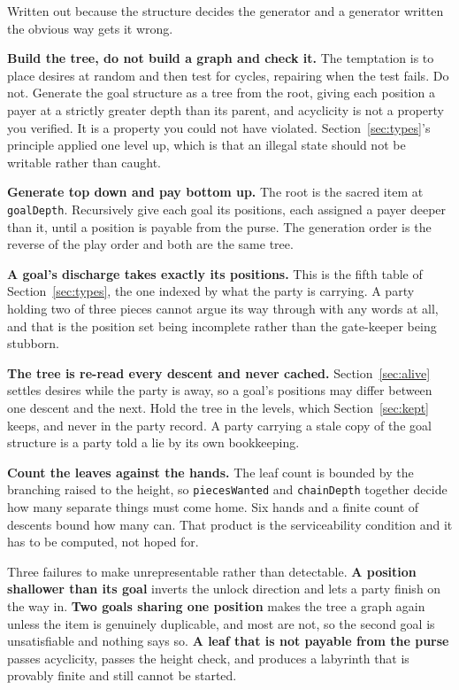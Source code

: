 \documentclass[11pt,a4paper]{article}
\begin{document}
Written out because the structure decides the generator and a generator written the obvious way
gets it wrong.

\textbf{Build the tree, do not build a graph and check it.} The temptation is to place desires at
random and then test for cycles, repairing when the test fails. Do not. Generate the goal structure
as a tree from the root, giving each position a payer at a strictly greater depth than its parent,
and acyclicity is not a property you verified. It is a property you could not have violated.
Section~\ref{sec:types}'s principle applied one level up, which is that an illegal state should not
be writable rather than caught.

\textbf{Generate top down and pay bottom up.} The root is the sacred item at \texttt{goalDepth}.
Recursively give each goal its positions, each assigned a payer deeper than it, until a position is
payable from the purse. The generation order is the reverse of the play order and both are the
same tree.

\textbf{A goal's discharge takes exactly its positions.} This is the fifth table of
Section~\ref{sec:types}, the one indexed by what the party is carrying. A party holding two of
three pieces cannot argue its way through with any words at all, and that is the position set being
incomplete rather than the gate-keeper being stubborn.

\textbf{The tree is re-read every descent and never cached.} Section~\ref{sec:alive} settles
desires while the party is away, so a goal's positions may differ between one descent and the next.
Hold the tree in the levels, which Section~\ref{sec:kept} keeps, and never in the party record.
A party carrying a stale copy of the goal structure is a party told a lie by its own bookkeeping.

\textbf{Count the leaves against the hands.} The leaf count is bounded by the branching raised to
the height, so \texttt{piecesWanted} and \texttt{chainDepth} together decide how many separate
things must come home. Six hands and a finite count of descents bound how many can. That product is
the serviceability condition and it has to be computed, not hoped for.

\begin{alarmbox}
Three failures to make unrepresentable rather than detectable. \textbf{A position shallower than
its goal} inverts the unlock direction and lets a party finish on the way in.
\textbf{Two goals sharing one position} makes the tree a graph again unless the item is genuinely
duplicable, and most are not, so the second goal is unsatisfiable and nothing says so.
\textbf{A leaf that is not payable from the purse} passes acyclicity, passes the height check, and
produces a labyrinth that is provably finite and still cannot be started.
\end{alarmbox}
\end{document}
